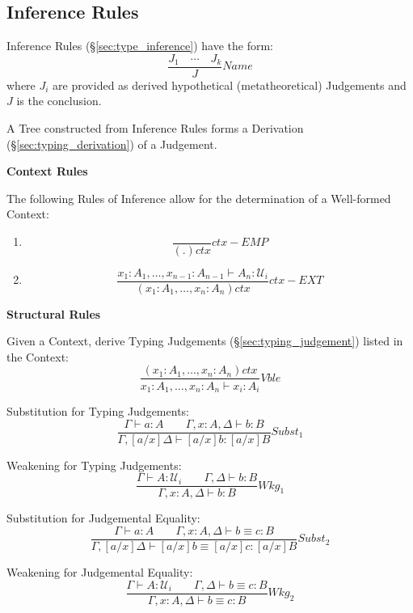 \subsection{Inference Rules}\label{sec:homotopy_rules}

Inference Rules (\S\ref{sec:type_inference}) have the form:
\[
  \frac{J_1 \quad \cdots \quad J_k} {J} Name
\]
where $J_i$ are provided as derived hypothetical (metatheoretical)
Judgements and $J$ is the conclusion.

A Tree constructed from Inference Rules forms a Derivation
(\S\ref{sec:typing_derivation}) of a Judgement.



\textbf{Context Rules}

The following Rules of Inference allow for the determination of a
Well-formed Context:
\begin{enumerate}
\item
\[
  {
    \frac{}{(.)ctx}
  } ctx-EMP
\]
\item
\[
  {
    \frac
    {x_1:A_1, \ldots, x_{n-1}:A_{n-1} \vdash A_n : \mathcal{U}_i}
    {(x_1:A_1,\ldots,x_n:A_n) ctx}
  } ctx-EXT
\]
\end{enumerate}



\textbf{Structural Rules}

Given a Context, derive Typing Judgements
(\S\ref{sec:typing_judgement}) listed in the Context:
\[
  {
    \frac
    {(x_1:A_1, \ldots, x_n:A_n)ctx}
    {x_1:A_1, \ldots, x_n:A_n \vdash x_i:A_i}
  } Vble
\]

Substitution for Typing Judgements:
\[
  {
    \frac
    {\Gamma \vdash a : A \;\;\;\;\;\;\;
    \Gamma,x:A,\Delta \vdash b : B}
    {\Gamma,[a/x]\Delta \vdash [a/x]b : [a/x]B}
  } Subst_1
\]

Weakening for Typing Judgements:
\[
  {
    \frac
    {\Gamma \vdash A : \mathcal{U}_i \;\;\;\;\;\;\;
    \Gamma,\Delta \vdash b : B}
    {\Gamma,x:A,\Delta \vdash b:B}
  } Wkg_1
\]

Substitution for Judgemental Equality:
\[
  {
    \frac
    {\Gamma \vdash a : A \;\;\;\;\;\;\;
    \Gamma,x:A,\Delta \vdash b \equiv c : B}
    {\Gamma,[a/x]\Delta \vdash [a/x]b \equiv [a/x]c : [a/x]B}
  } Subst_2
\]

Weakening for Judgemental Equality:
\[
  {
    \frac
    {\Gamma \vdash A : \mathcal{U}_i \;\;\;\;\;\;\;
    \Gamma,\Delta \vdash b \equiv c : B}
    {\Gamma, x:A, \Delta \vdash b \equiv c : B}
  } Wkg_2
\]



